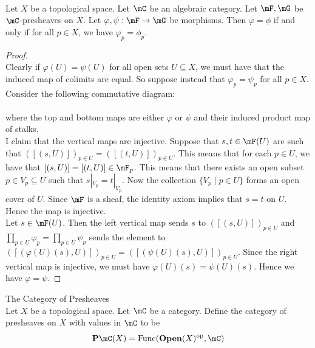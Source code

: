 \documentclass[a4paper]{article}
\begin{document}
\begin{prp}{}{}\\
Let $X$ be a topological space. Let $\mC$ be an algebraic category. Let $\mF,\mG$ be $\mC$-presheaves on $X$. Let $\varphi,\psi:\mF\to\mG$ be morphisms. Then $\varphi=\phi$ if and only if for all $p\in X$, we have $\varphi_p=\phi_p$. 
\begin{proof}\\
Clearly if $\varphi(U)=\psi(U)$ for all open sets $U\subseteq X$, we must have that the induced map of colimits are equal. So suppose instead that $\varphi_p=\psi_p$ for all $p\in X$. Consider the following commutative diagram: \\
 \\
where the top and bottom maps are either $\varphi$ or $\psi$ and their induced product map of stalks. \\

I claim that the vertical maps are injective. Suppose that $s,t\in\mF(U)$ are such that $([(s,U)])_{p\in U}=([(t,U)])_{p\in U}$. This means that for each $p\in U$, we have that $[(s,U)]=[(t,U)]\in\mF_p$. This means that there exists an open subset $p\in V_p\subseteq U$ such that $s|_{V_p}=t|_{V_p}$. Now the collection $\{V_p\;|\;p\in U\}$ forms an open cover of $U$. Since $\mF$ is a sheaf, the identity axiom implies that $s=t$ on $U$. Hence the map is injective. \\

Let $s\in\mF(U)$. Then the left vertical map sends $s$ to $([(s,U)])_{p\in U}$ and $\prod_{p\in U}\varphi_p=\prod_{p\in U}\psi_p$ sends the element to $([(\varphi(U)(s),U)])_{p\in U}=([(\psi(U)(s),U)])_{p\in U}$. Since the right vertical map is injective, we must have $\varphi(U)(s)=\psi(U)(s)$. Hence we have $\varphi=\psi$. 
\end{proof}
\end{prp}

\begin{defn}{The Category of Presheaves}{}\\
Let $X$ be a topological space. Let $\mC$ be a category. Define the category of presheaves on $X$ with values in $\mC$ to be $$\bold{P}\mC(X)=\text{Func}(\bold{Open}(X)^\text{op},\mC)$$
\end{defn}
\end{document}
